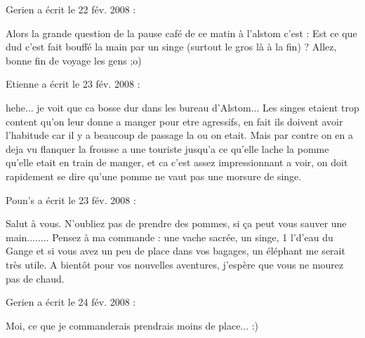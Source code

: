 \medskip
Gerien a écrit le 22 fév. 2008 :
\begin{displayquote}
Alors la grande question de la pause café de ce matin à l'alstom c'est : 
Est ce que dud c'est fait bouffé la main par un singe (surtout le gros là à la fin) ?
Allez, bonne fin de voyage les gens ;o)
\end{displayquote}

\medskip
Etienne a écrit le 23 fév. 2008 :
\begin{displayquote}
hehe... je voit que ca bosse dur dans les bureau d'Alstom...
Les singes etaient trop content qu'on leur donne a manger pour etre agressifs, en fait ils doivent avoir l'habitude car il y a beaucoup de passage la ou on etait. Mais par contre on en a deja vu flanquer la frousse a une touriste jusqu'a ce qu'elle lache la pomme qu'elle etait en train de manger, et ca c'est assez impressionnant a voir, on doit rapidement se dire qu'une pomme ne vaut pas une morsure de singe.
\end{displayquote}

\medskip
Poun's a écrit le 23 fév. 2008 :
\begin{displayquote}
Salut à vous. N'oubliez pas de prendre des pommes, si ça peut vous sauver une main........
Pensez à ma commande : une vache sacrée, un singe, 1 l'd'eau du Gange et si vous avez un peu de place dans vos bagages, un éléphant me serait très utile.
A bientôt pour vos nouvelles aventures, j'espère que vous ne mourez pas de chaud.
\end{displayquote}

\medskip
Gerien a écrit le 24 fév. 2008 :
\begin{displayquote}
Moi, ce que je commanderais prendrais moins de place...
:)
\end{displayquote}


